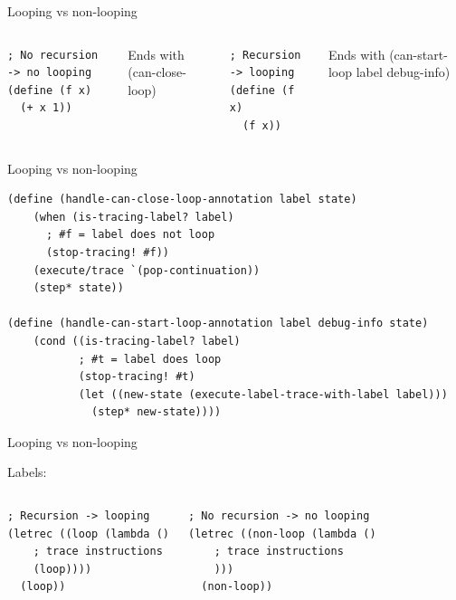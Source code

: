 \documentclass{beamer}
\begin{document}
\begin{frame}[fragile]{Looping vs non-looping}

\begin{columns}[c]
\begin{lstlisting}[basicstyle = \footnotesize\ttfamily, escapechar = £]
; No recursion -> no looping
(define (f x)
  (+ x 1))
\end{lstlisting}
Ends with (can-close-loop)
\pause

\begin{lstlisting}[basicstyle = \footnotesize\ttfamily, escapechar = £]
; Recursion -> looping
(define (f x)
  (f x))
\end{lstlisting}
Ends with (can-start-loop label debug-info)
\end{columns}
\end{frame}

\begin{frame}[fragile]{Looping vs non-looping}
\begin{lstlisting}[basicstyle = \footnotesize\ttfamily, escapechar = £]
(define (handle-can-close-loop-annotation label state)
    (when (is-tracing-label? label)
      ; #f = label does not loop
      (stop-tracing! #f))
    (execute/trace `(pop-continuation))
    (step* state))
    
(define (handle-can-start-loop-annotation label debug-info state)
    (cond ((is-tracing-label? label)
           ; #t = label does loop
           (stop-tracing! #t)
           (let ((new-state (execute-label-trace-with-label label)))
             (step* new-state))))
\end{lstlisting}
\end{frame}

\begin{frame}[fragile]{Looping vs non-looping}

Labels:
\begin{columns}[c]
\begin{lstlisting}[basicstyle = \footnotesize\ttfamily, escapechar = £]
; Recursion -> looping
(letrec ((loop (lambda ()
    ; trace instructions
    (loop))))
  (loop))
\end{lstlisting}
\pause

\begin{lstlisting}[basicstyle = \footnotesize\ttfamily, escapechar = £]
; No recursion -> no looping
(letrec ((non-loop (lambda ()
    ; trace instructions
    )))
  (non-loop))
\end{lstlisting}
\end{columns}

\end{frame}
\end{document}
